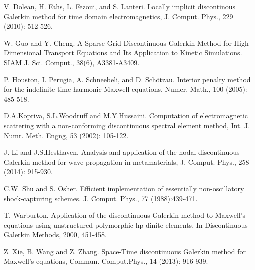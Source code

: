 \documentclass[final,leqno]{siamltex704}
\begin{document}
\begin{thebibliography}{99}
V. Dolean, H. Fahs, L. Fezoui, and S. Lanteri. Locally implicit discontinous Galerkin method for time domain electromagnetics, J. Comput. Phys., 229 (2010): 512-526.

W. Guo and Y. Cheng. A Sparse Grid Discontinuous Galerkin Method for High-Dimensional Transport Equations and Its Application to Kinetic Simulations. SIAM J. Sci. Comput., 38(6), A3381-A3409. 

P. Houston, I. Perugia, A. Schneebeli, and D. Sch\"{o}tzau. Interior penalty method for the indefinite time-harmonic
Maxwell equations. Numer. Math., 100 (2005): 485-518.

D.A.Kopriva, S.L.Woodruff and M.Y.Hussaini. Computation of electromagnetic scattering with a non-conforming discontinuous spectral element method, Int. J. Numr. Meth. Engng, 53 (2002): 105-122.

J. Li and J.S.Hesthaven. Analysis and application of the nodal discontinuous Galerkin method for wave propagation in metamaterials, J. Comput. Phys., 258 (2014): 915-930.

C.W. Shu and S. Osher. Efficient implementation of essentially non-oscillatory shock-capturing schemes. J. Comput.
Phys., 77 (1988):439-471.


T. Warburton. Application of the discontinuous Galerkin method to Maxwell's equations using unstructured polymorphic hp-dinite elements, In Discontinuous Galerkin Methods, 2000, 451-458.

Z. Xie, B. Wang and Z. Zhang. Space-Time discontinuous Galerkin method for Maxwell's equations, Commun. Comput.Phys., 14 (2013): 916-939.



\end{thebibliography}
\end{document}
